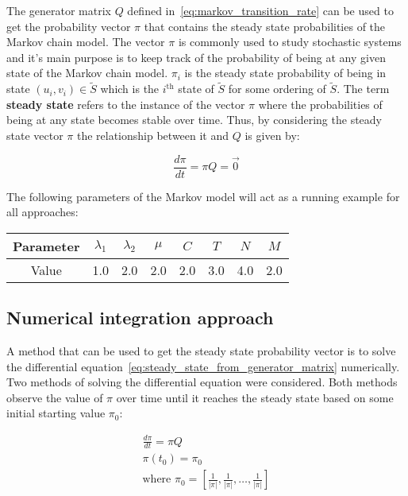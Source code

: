 The generator matrix \( Q \) defined in~\eqref{eq:markov_transition_rate} can
be used to get the probability vector \( \pi \) that contains the steady state
probabilities of the Markov chain model.
The vector \( \pi \) is commonly used to study stochastic systems and it's main
purpose is to keep track of the probability of being at any given state of
the Markov chain model.
\(\pi_i\) is the steady state probability of being in state \((u_i, v_i) \in
\tilde S\) which is the \(i^{\text{th}}\) state of \(\tilde S\) for some
ordering of \(\tilde S\).
The term \textbf{steady state} refers to the instance of the vector \( \pi \)
where the probabilities of being at any state becomes stable over time.
Thus, by considering the steady state vector \( \pi \) the relationship between
it and \( Q \) is given by:

\begin{equation}\label{eq:steady_state_from_generator_matrix}
    \frac{d\pi}{dt} = \pi Q = \vec{0}
\end{equation}

The following parameters of the Markov model will act as a running example for
all approaches:

\begin{center}
    \begin{tabular}{|c|c|c|c|c|c|c|c|}
        \hline
        Parameter & \(\lambda_1\) & \(\lambda_2\) & \(\mu\) & \(C\) & \(T\)
        & \(N\) & \(M\) \\
        \hline
        Value & 1.0 & 2.0 & 2.0 & 2.0 & 3.0 & 4.0 & 2.0 \\
        \hline
    \end{tabular}
\end{center}


\subsection{Numerical integration approach}

A method that can be used to get the steady state probability vector is
to solve the differential equation~\eqref{eq:steady_state_from_generator_matrix}
numerically.
Two methods of solving the differential equation were considered.
Both methods observe the value of \(\pi\) over time until it
reaches the steady state based on some initial starting value \(\pi_0\):

\begin{gather}
    \frac{d\pi}{dt} = \pi Q \\
    \pi(t_0) = \pi_0 \nonumber \\
    \text{where } \pi_0 =
    [\frac{1}{|\pi|}, \frac{1}{|\pi|}, \dots, \frac{1}{|\pi|}] \nonumber
\end{gather}

